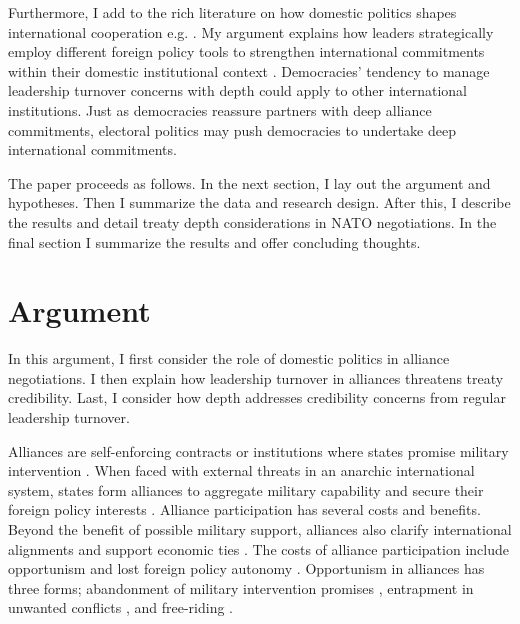 \documentclass[12pt]{article}
\begin{document}
Furthermore, I add to the rich literature on how domestic politics shapes international cooperation e.g. \citep{DownesRocke1995, Fearon1998, Leeds1999, MattesRodriguez2014}.
My argument explains how leaders strategically employ different foreign policy tools to strengthen international commitments within their domestic institutional context \citep{HydeSaunders2020}.  
Democracies' tendency to manage leadership turnover concerns with depth could apply to other international institutions. 
Just as democracies reassure partners with deep alliance commitments, electoral politics may push democracies to undertake deep international commitments.%


The paper proceeds as follows. 
In the next section, I lay out the argument and hypotheses. 
Then I summarize the data and research design. 
After this, I describe the results and detail treaty depth considerations in NATO negotiations.
In the final section I summarize the results and offer concluding thoughts. 


\section{Argument}


In this argument, I first consider the role of domestic politics in alliance negotiations. 
I then explain how leadership turnover in alliances threatens treaty credibility. 
Last, I consider how depth addresses credibility concerns from regular leadership turnover. 


Alliances are self-enforcing contracts or institutions where states promise military intervention \citep{Leedsetal2002, Morrow2000}. 
When faced with external threats in an anarchic international system, states form alliances to aggregate military capability and secure their foreign policy interests \citep{Altfield1984, Snyder1997, FordhamPoast2014}.
Alliance participation has several costs and benefits.
Beyond the benefit of possible military support, alliances also clarify international alignments \citep{Snyder1997} and support economic ties \citep{Gowa1995, Long2003, Fordham2010, WolfordKim2017}.  
The costs of alliance participation include opportunism and lost foreign policy autonomy \citep{Altfield1984, Morrow2000, Johnson2015}. 
Opportunism in alliances has three forms; abandonment of military intervention promises \citep{Leeds2003a, BerkemeierFuhrmann2018}, entrapment in unwanted conflicts \citep{Snyder1984}, and free-riding \citep{Morrow2000}.
\end{document}
